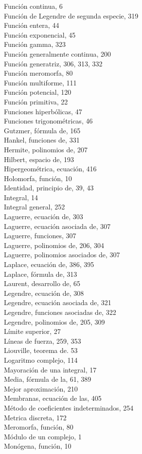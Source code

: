 \documentclass[10pt]{article}
\theoremstyle{plain}
\theoremstyle{definition}
\theoremstyle{remark}
\begin{document}
Función continua, 6\\
Función de Legendre de segunda especie, 319\\
Función entera, 44\\
Función exponencial, 45\\
Función gamma, 323\\
Función generalmente continua, 200\\
Función generatriz, 306, 313, 332\\
Función meromorfa, 80\\
Función multiforme, 111\\
Función potencial, 120\\
Función primitiva, 22\\
Funciones hiperbólicas, 47\\
Funciones trigonométricas, 46\\
Gutzmer, fórmula de, 165\\
Hankel, funciones de, 331\\
Hermite, polinomios de, 207\\
Hilbert, espacio de, 193\\
Hipergeométrica, ecuación, 416\\
Holomorfa, función, 10\\
Identidad, principio de, 39, 43\\
Integral, 14\\
Integral general, 252\\
Laguerre, ecuación de, 303\\
Laguerre, ecuación asociada de, 307\\
Laguerre, funciones, 307\\
Laguerre, polinomios de, 206, 304\\
Laguerre, polinomios asociados de, 307\\
Laplace, ecuación de, 386, 395\\
Laplace, fórmula de, 313\\
Laurent, desarrollo de, 65\\
Legendre, ecuación de, 308\\
Legendre, ecuación asociada de, 321\\
Legendre, funciones asociadas de, 322\\
Legendre, polinomios de, 205, 309\\
Límite superior, 27\\
Líneas de fuerza, 259, 353\\
Liouville, teorema de. 53\\
Logaritmo complejo, 114\\
Mayoración de una integral, 17\\
Media, fórmula de la, 61, 389\\
Mejor aproximación, 210\\
Membranas, ecuación de las, 405\\
Método de coeficientes indeterminados, 254\\
Metrica discreta, 172\\
Meromorfa, función, 80\\
Módulo de un complejo, 1\\
Monógena, función, 10
\end{document}

